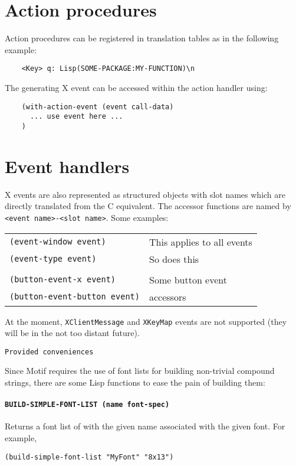 \documentclass[a4paper]{article}
\newcommand{\functdescr}[1]{\paragraph{\texttt{#1}}}
\begin{document}
\section{Action procedures}

Action procedures can be registered in translation tables as in the
following example:

\begin{verbatim}
	<Key> q: Lisp(SOME-PACKAGE:MY-FUNCTION)\n
\end{verbatim}

\noindent
The generating X event can be accessed within the action handler
using:

\begin{verbatim}
	(with-action-event (event call-data)
	  ... use event here ...
	)
\end{verbatim}


\section{Event handlers}

X events are also represented as structured objects with slot names
which are directly translated from the C equivalent.  The accessor
functions are named by \texttt{<event name>-<slot name>}.  Some
examples:\\[2mm]
\begin{tabular}{ll}
\texttt{(event-window event)}  & This applies to all events\\
\texttt{(event-type event)}    & So does this\\
 & \\
\texttt{(button-event-x event)}      & Some button event\\
\texttt{(button-event-button event)} & accessors\\
\end{tabular}

At the moment, \texttt{XClientMessage} and \texttt{XKeyMap} events are
not supported (they will be in the not too distant future).


\texttt{Provided conveniences}

Since Motif requires the use of font lists for building non-trivial
compound strings, there are some Lisp functions to ease the pain of
building them:

\functdescr{BUILD-SIMPLE-FONT-LIST (name font-spec)} Returns a font
list of with the given name associated with the given font.  For
example,

\begin{verbatim}
(build-simple-font-list "MyFont" "8x13")
\end{verbatim}
\end{document}
